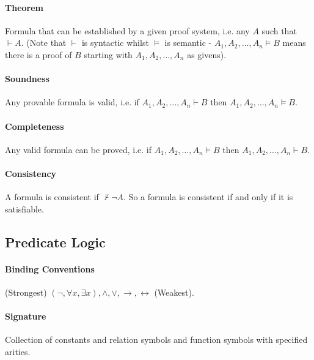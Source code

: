 \documentclass[10pt,twoside,twocolumn]{article}
\begin{document}
\paragraph{Theorem}

Formula that can be established by a given proof system, i.e. any
$A$ such that $\vdash A$. (Note that $\vdash$ is syntactic whilst
$\vDash$ is semantic - $A_{1},A_{2},\dots,A_{n}\vDash B$ means there
is a proof of $B$ starting with $A_{1},A_{2},\dots,A_{n}$ as givens).


\paragraph{Soundness}

Any provable formula is valid, i.e. if $A_{1},A_{2},\dots,A_{n}\vdash B$
then $A_{1},A_{2},\dots,A_{n}\vDash B$.


\paragraph{Completeness}

Any valid formula can be proved, i.e. if $A_{1},A_{2},\dots,A_{n}\vDash B$
then $A_{1},A_{2},\dots,A_{n}\vdash B$.


\paragraph{Consistency}

A formula is consistent if $\not\vdash\lnot A$. So a formula is consistent
if and only if it is satisfiable.


\subsection{Predicate Logic}


\paragraph{Binding Conventions}

(Strongest) $(\lnot,\forall x,\exists x),\land,\lor,\rightarrow,\leftrightarrow$ (Weakest).


\paragraph{Signature}

Collection of constants and relation symbols and function symbols
with specified arities.
\end{document}
